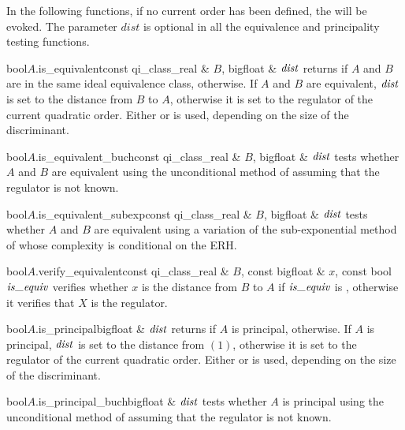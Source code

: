 
In the following functions, if no current order has been defined, the \LEH will be evoked.  The
parameter $dist$ is optional in all the equivalence and principality testing functions.

\begin{cfcode}{bool}{$A$.is_equivalent}{const qi_class_real & $B$, bigfloat & $\mathit{dist}$}
  returns \TRUE if $A$ and $B$ are in the same ideal equivalence class, \FALSE otherwise.  If
  $A$ and $B$ are equivalent, $\mathit{dist}$ is set to the distance from $B$ to $A$, otherwise it is set
  to the regulator of the current quadratic order.  Either  or
   is used, depending on the size of the discriminant.
\end{cfcode}

\begin{cfcode}{bool}{$A$.is_equivalent_buch}{const qi_class_real & $B$, bigfloat & $\mathit{dist}$}
  tests whether $A$ and $B$ are equivalent using the unconditional method of
  \cite{Biehl/Buchmann:1995} assuming that the regulator is not known.
\end{cfcode}

\begin{cfcode}{bool}{$A$.is_equivalent_subexp}{const qi_class_real & $B$, bigfloat & $\mathit{dist}$}
  tests whether $A$ and $B$ are equivalent using a variation of the sub-exponential method of
  \cite{Jacobson_Thesis:1999} whose complexity is conditional on the ERH.
\end{cfcode}

\begin{cfcode}{bool}{$A$.verify_equivalent}{const qi_class_real & $B$, const bigfloat & $x$,
    const bool $\isequiv$}%
  verifies whether $x$ is the distance from $B$ to $A$ if $\isequiv$ is \TRUE, otherwise it
  verifies that $X$ is the regulator.
\end{cfcode}

\begin{cfcode}{bool}{$A$.is_principal}{bigfloat & $\mathit{dist}$}
  returns \TRUE if $A$ is principal, \FALSE otherwise.  If $A$ is principal, $\mathit{dist}$ is set to
  the distance from $(1)$, otherwise it is set to the regulator of the current quadratic order.
  Either  or  is used, depending on the size
  of the discriminant.
\end{cfcode}

\begin{cfcode}{bool}{$A$.is_principal_buch}{bigfloat & $\mathit{dist}$}
  tests whether $A$ is principal using the unconditional method of \cite{Biehl/Buchmann:1995}
  assuming that the regulator is not known.
\end{cfcode}

